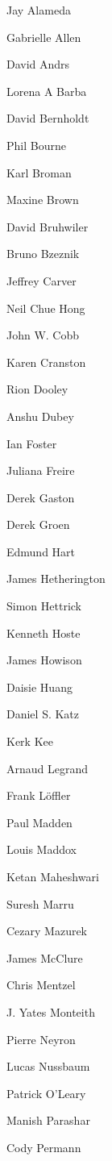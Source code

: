 \documentclass[11pt, oneside]{amsart}
\begin{document}
\begin{multicols}{4}
\setlength{\parindent}{0pt}

Jay Alameda

Gabrielle Allen

David Andrs

Lorena A Barba

David Bernholdt

Phil Bourne

Karl Broman

Maxine Brown

David Bruhwiler

Bruno Bzeznik

Jeffrey Carver

Neil Chue Hong

John W. Cobb

Karen Cranston

Rion Dooley

Anshu Dubey

Ian Foster

Juliana Freire

Derek Gaston

Derek Groen

Edmund Hart

James Hetherington

Simon Hettrick

Kenneth Hoste

James Howison

Daisie Huang

Daniel S. Katz

Kerk Kee

Arnaud Legrand

Frank L\"{o}ffler

Paul Madden

Louis Maddox

Ketan Maheshwari

Suresh Marru

Cezary Mazurek

James McClure

Chris Mentzel

J. Yates Monteith

Pierre Neyron

Lucas Nussbaum

Patrick O'Leary

Manish Parashar

Cody Permann


\end{multicols}
\end{document}
